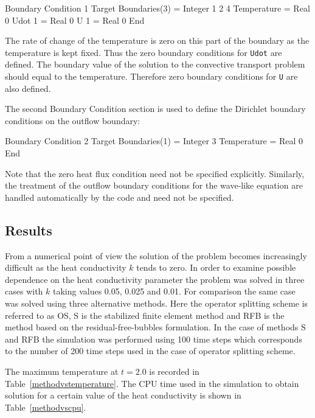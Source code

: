 \ttbegin
Boundary Condition 1
  Target Boundaries(3) = Integer 1 2 4 
  Temperature = Real 0
  Udot 1 = Real 0
  U 1 = Real 0
End
\ttend

The rate of change of the temperature is zero on this part of the boundary 
as the temperature is kept fixed. Thus the zero boundary 
conditions for {\tt Udot} are defined. The boundary value of the
solution to the convective transport problem should equal to the
temperature. Therefore zero boundary conditions for {\tt U} are also defined.
  
The second Boundary Condition section is used to define the Dirichlet boundary 
conditions on the outflow boundary: 

\ttbegin
Boundary Condition 2
  Target Boundaries(1) = Integer 3
  Temperature = Real 0
End
\ttend

Note that the zero heat flux condition
need not be specified explicitly. Similarly, the treatment of 
the outflow boundary conditions for the wave-like
equation are handled automatically by the code and need not be specified. 


\subsection*{Results}

From a numerical point of view the solution of the problem becomes 
increasingly difficult as the heat conductivity $k$ tends to zero. 
In order to examine possible dependence on the heat conductivity parameter
the problem was solved in three cases with $k$ taking values 0.05, 0.025 
and 0.01. For comparison the same case was solved using three alternative 
methods. Here the operator splitting scheme is referred to as OS, S is the 
stabilized finite element method and RFB is the method based on the 
residual-free-bubbles formulation. In the case of methods S and RFB the 
simulation was performed using 100 time steps which corresponds to the number 
of 200 time steps used in the case of operator splitting scheme.
 
The maximum temperature at $t=2.0$ is recorded in 
Table~\ref{methodvstemperature}. The CPU time used in the simulation to
obtain solution for a certain value of the heat conductivity is
shown in Table~\ref{methodvscpu}.
   
